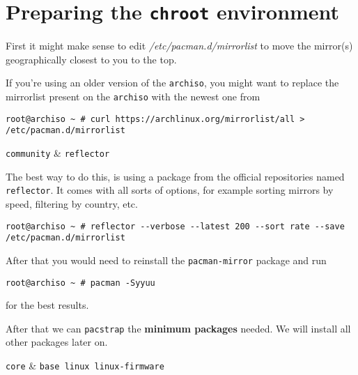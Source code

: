 \documentclass[10pt]{dustdoc}
\begin{document}
\section{Preparing the \texttt{chroot} environment}
\label{sec:preparing-the-chroot-environment}

First it might make sense to edit \textit{/etc/pacman.d/mirrorlist} to move the mirror(s) geographically closest to you to the top.

If you're using an older version of the \texttt{archiso}, you might want to replace the mirrorlist present on the \texttt{archiso} with the newest one from 

\begin{verbatim}
root@archiso ~ # curl https://archlinux.org/mirrorlist/all > /etc/pacman.d/mirrorlist
\end{verbatim}

\begin{NOTE}
    \begin{packagetable}
        \texttt{community} & \texttt{reflector} \\
    \end{packagetable}

    The best way to do this, is using a package from the official repositories named \texttt{reflector}.
    It comes with all sorts of options, for example sorting mirrors by speed, filtering by country, etc.

    \begin{verbatim}
root@archiso ~ # reflector --verbose --latest 200 --sort rate --save /etc/pacman.d/mirrorlist
    \end{verbatim}

    After that you would need to reinstall the \texttt{pacman-mirror} package and run

    \begin{verbatim}
root@archiso ~ # pacman -Syyuu
    \end{verbatim}

    \noindent
    for the best results.
\end{NOTE}

After that we can \texttt{pacstrap} the \textbf{minimum packages} needed.
We will install all other packages later on.

\begin{packagetable}
    \texttt{core} & \texttt{base linux linux-firmware} \\
\end{packagetable}
\end{document}
